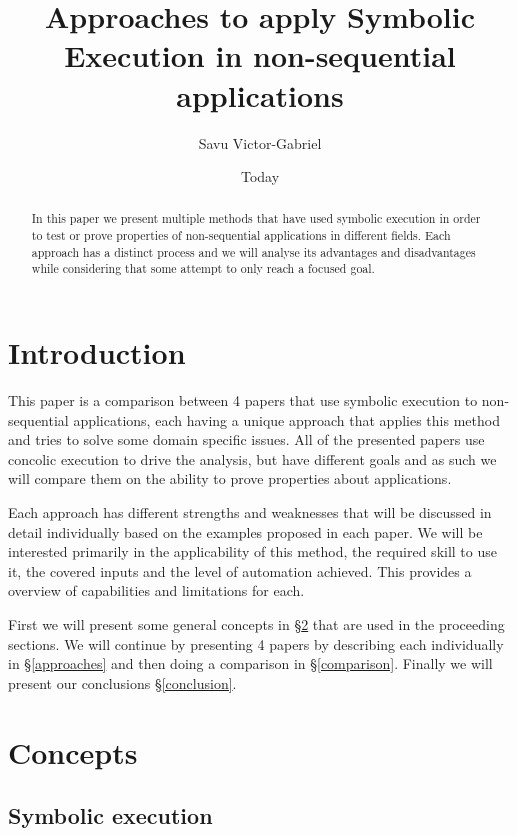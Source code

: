 \documentclass[10pt]{llncs}
\begin{document}
\title{Approaches to apply Symbolic Execution in non-sequential applications}
\author{Savu Victor-Gabriel}
\date{Today}
\maketitle

\begin{abstract}
	In this paper we present multiple methods that have used symbolic execution in order to test or prove properties of non-sequential applications in different fields. Each approach has a distinct process and we will analyse its advantages and disadvantages while considering that some attempt to only reach a focused goal.
\end{abstract}

\section{Introduction}

This paper is a comparison between 4 papers that use symbolic execution to non-sequential applications, each having a unique approach that applies this method and tries to solve some domain specific issues. All of the presented papers use concolic execution to drive the analysis, but have different goals and as such we will compare them on the ability to prove properties about applications.

Each approach has different strengths and weaknesses that will be discussed in detail individually based on the examples proposed in each paper. We will be interested primarily in the applicability of this method, the required skill to use it, the covered inputs and the level of automation achieved. This provides a overview of capabilities and limitations for each.

First we will present some general concepts in §\ref{concepts} that are used in the proceeding sections. We will continue by presenting 4 papers \cite{base3, base4, base5, base7} by describing each individually in §\ref{approaches} and then doing a comparison in §\ref{comparison}. Finally we will present our conclusions §\ref{conclusion}.

\section{Concepts}
\label{concepts}

\subsection{Symbolic execution}
\end{document}

